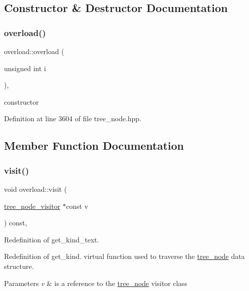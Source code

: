 \subsection{Constructor \& Destructor Documentation}
\mbox{\label{structoverload_ad284e77aa7f5b91b5f8716a02cc31374}} 
\subsubsection{\texorpdfstring{overload()}{overload()}}
{\footnotesize\ttfamily overload\+::overload (\begin{DoxyParamCaption}\item[{unsigned int}]{i }\end{DoxyParamCaption})\hspace{0.3cm}{\ttfamily [inline]}, {\ttfamily [explicit]}}



constructor 



Definition at line 3604 of file tree\+\_\+node.\+hpp.



\subsection{Member Function Documentation}
\mbox{\label{structoverload_af5069d7e549fbd84ae60f60b8efaf225}} 
\subsubsection{\texorpdfstring{visit()}{visit()}}
{\footnotesize\ttfamily void overload\+::visit (\begin{DoxyParamCaption}\item[{\hyperlink{classtree__node__visitor}{tree\+\_\+node\+\_\+visitor} $\ast$const}]{v }\end{DoxyParamCaption}) const\hspace{0.3cm}{\ttfamily [override]}, {\ttfamily [virtual]}}



Redefinition of get\+\_\+kind\+\_\+text. 

Redefinition of get\+\_\+kind. virtual function used to traverse the \hyperlink{classtree__node}{tree\+\_\+node} data structure. 
\begin{DoxyParams}{Parameters}
{\em v} & is a reference to the \hyperlink{classtree__node}{tree\+\_\+node} visitor class \\
\hline
\end{DoxyParams}


